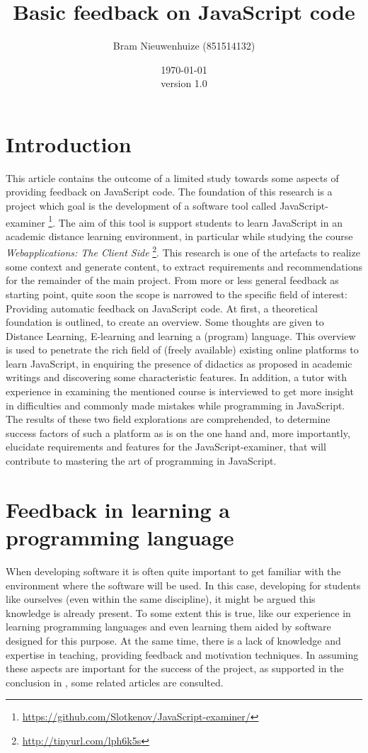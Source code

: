 \documentclass{article}
\begin{document}
 

\title{Basic feedback on JavaScript code} \author{Bram Nieuwenhuize (851514132)} 
\date{\today \\version 1.0} \maketitle 

\section{Introduction} This article contains the outcome of a limited study 
towards 
some aspects of providing feedback on JavaScript code. The foundation of this 
research is a project which goal is the development of a software tool called 
JavaScript-examiner
\footnote{\url{https://github.com/Slotkenov/JavaScript-examiner/}}.
The aim of this tool is support students to learn 
JavaScript in an academic distance learning environment, in particular
while studying the course {\em Webapplications: The Client Side}
\footnote{\url{http://tinyurl.com/lph6k5s}}. This research is one of 
the artefacts to realize some context and generate content, to extract 
requirements and recommendations for the remainder of the main project.  
From more or less general feedback as starting point, quite soon the scope is 
narrowed to the specific field of interest: Providing automatic feedback on 
JavaScript code. At first, a theoretical foundation is outlined, to create an 
overview. Some thoughts are given to Distance Learning, E-learning and 
learning a (program) language.
This overview is used to penetrate the rich field of (freely 
available) existing online platforms to learn JavaScript, in enquiring the
presence of didactics as proposed in academic writings and discovering some 
characteristic features. In addition, a tutor with experience in examining
the mentioned course is 
interviewed to get more insight in difficulties and commonly made mistakes while 
programming in JavaScript. The results of these two field explorations are 
comprehended, to determine success factors of such a platform as is on the one 
hand and, more importantly, elucidate requirements and features for the 
JavaScript-examiner, that will contribute to mastering the art of programming in 
JavaScript. 

\section{Feedback in learning a programming language}
When developing software it is often quite important to get familiar with the 
environment where the software will be used. In this case, developing for
students like ourselves (even within the same discipline), it might be argued
this knowledge is already present. To some extent this is true, like our
experience in learning programming languages and even learning them aided by 
software designed for this purpose. At the same time, there is a lack of
knowledge and expertise in teaching, providing feedback and 
motivation techniques. In assuming these aspects are important for the success
of the project, as supported in the conclusion in
\citep{al2009investigating}, some related articles are consulted.
\end{document}
